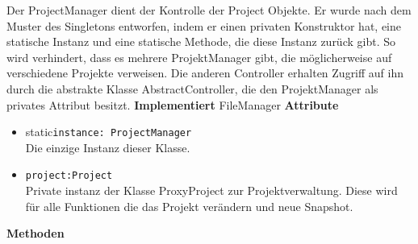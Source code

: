 \documentclass{article}
\begin{document}
Der ProjectManager dient der Kontrolle der Project Objekte. Er wurde nach dem Muster des Singletons entworfen, indem er einen privaten Konstruktor hat, eine statische Instanz und eine statische Methode, die diese Instanz zurück gibt. So wird verhindert, dass es mehrere ProjektManager gibt, die möglicherweise auf verschiedene Projekte verweisen. Die anderen Controller erhalten Zugriff auf ihn durch die abstrakte Klasse AbstractController, die den ProjektManager als privates Attribut besitzt.
\newline\newline
\textbf{\large{Implementiert}} FileManager 
\newline\newline
\textbf{\large{Attribute}}
\begin{itemize}
\item \flqq{}static\frqq \texttt{instance: ProjectManager}\\ Die einzige Instanz dieser Klasse.
\item \texttt{project:Project}\\Private instanz der Klasse ProxyProject zur Projektverwaltung. Diese wird für alle Funktionen die das Projekt verändern und neue Snapshot. 
\end{itemize}\leavevmode\newline
\textbf{\large{Methoden}}
\end{document}
